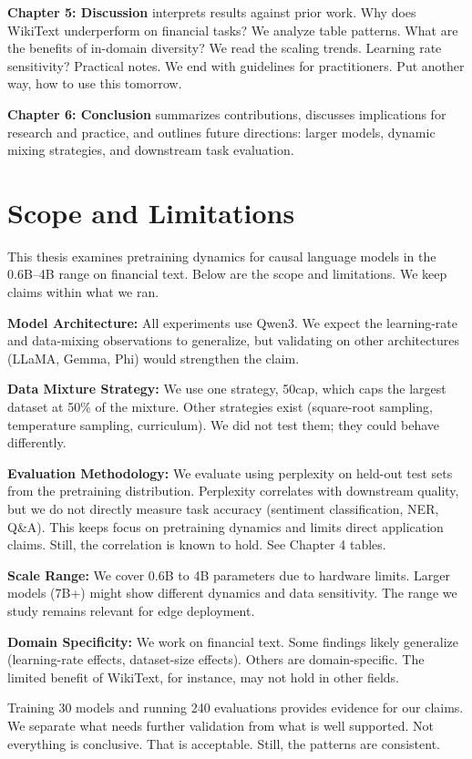 \textbf{Chapter 5: Discussion} interprets results against prior work. Why does WikiText underperform on financial tasks? We analyze table patterns. What are the benefits of in-domain diversity? We read the scaling trends. Learning rate sensitivity? Practical notes. We end with guidelines for practitioners. Put another way, how to use this tomorrow.

\textbf{Chapter 6: Conclusion} summarizes contributions, discusses implications for research and practice, and outlines future directions: larger models, dynamic mixing strategies, and downstream task evaluation.

\section{Scope and Limitations}

This thesis examines pretraining dynamics for causal language models in the 0.6B--4B range on financial text. Below are the scope and limitations. We keep claims within what we ran.

\textbf{Model Architecture:} All experiments use Qwen3. We expect the learning-rate and data-mixing observations to generalize, but validating on other architectures (LLaMA, Gemma, Phi) would strengthen the claim.

\textbf{Data Mixture Strategy:} We use one strategy, 50cap, which caps the largest dataset at 50\% of the mixture. Other strategies exist (square-root sampling, temperature sampling, curriculum). We did not test them; they could behave differently.

\textbf{Evaluation Methodology:} We evaluate using perplexity on held-out test sets from the pretraining distribution. Perplexity correlates with downstream quality, but we do not directly measure task accuracy (sentiment classification, NER, Q\&A). This keeps focus on pretraining dynamics and limits direct application claims. Still, the correlation is known to hold. See Chapter 4 tables.

\textbf{Scale Range:} We cover 0.6B to 4B parameters due to hardware limits. Larger models (7B+) might show different dynamics and data sensitivity. The range we study remains relevant for edge deployment.

\textbf{Domain Specificity:} We work on financial text. Some findings likely generalize (learning-rate effects, dataset-size effects). Others are domain-specific. The limited benefit of WikiText, for instance, may not hold in other fields.

Training 30 models and running 240 evaluations provides evidence for our claims. We separate what needs further validation from what is well supported. Not everything is conclusive. That is acceptable. Still, the patterns are consistent.
